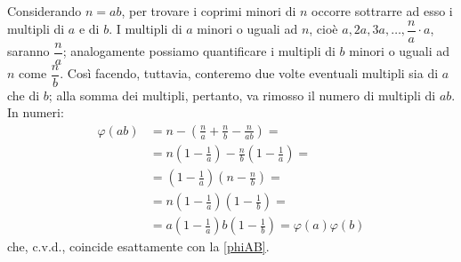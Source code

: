 \documentclass[a4paper,12pt]{article}
\begin{document}
Considerando $n=ab$, per trovare i coprimi minori di $n$ occorre sottrarre ad esso i multipli di $a$ e di $b$. I multipli di $a$ minori o uguali ad $n$, cioè $a,2a,3a,\hdots,\dfrac{n}{a}\cdot a$, saranno $\dfrac{n}{a}$; analogamente possiamo quantificare i multipli di $b$ minori o uguali ad $n$ come $\dfrac{n}{b}$. Così facendo, tuttavia, conteremo due volte eventuali multipli sia di $a$ che di $b$; alla somma dei multipli, pertanto, va rimosso il numero di multipli di $ab$. In numeri:
\begin{equation}
\begin{split}
\varphi(ab) & = n-\left(\frac{n}{a}+\frac{n}{b}-\frac{n}{ab}\right)= \\
& = n\left(1-\frac{1}{a}\right)-\frac{n}{b}\left(1-\frac{1}{a}\right)=\\
& = \left(1-\frac{1}{a}\right)\left(n-\frac{n}{b}\right)=\\
& = n\left(1-\frac{1}{a}\right)\left(1-\frac{1}{b}\right)=\\
& = a\left(1-\frac{1}{a}\right)b\left(1-\frac{1}{b}\right)=\varphi(a)\varphi(b)
\end{split}
\end{equation}
che, c.v.d., coincide esattamente con la \eqref{phiAB}.
\end{document}
